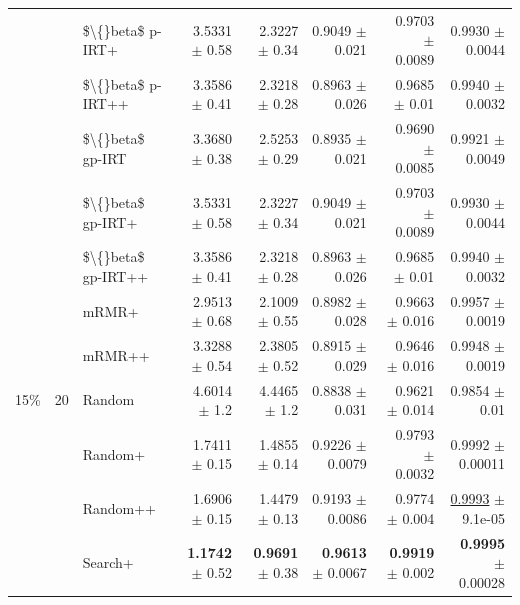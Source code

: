 \begin{longtable}{llp{}rrrrr}
 &  & \$\textbackslash\{\}beta\$ p-IRT+ & 3.5331 {\scriptsize $\pm$ 0.58} & 2.3227 {\scriptsize $\pm$ 0.34} & 0.9049 {\scriptsize $\pm$ 0.021} & 0.9703 {\scriptsize $\pm$ 0.0089} & 0.9930 {\scriptsize $\pm$ 0.0044} \\
 &  & \$\textbackslash\{\}beta\$ p-IRT++ & 3.3586 {\scriptsize $\pm$ 0.41} & 2.3218 {\scriptsize $\pm$ 0.28} & 0.8963 {\scriptsize $\pm$ 0.026} & 0.9685 {\scriptsize $\pm$ 0.01} & 0.9940 {\scriptsize $\pm$ 0.0032} \\
 &  & \$\textbackslash\{\}beta\$ gp-IRT & 3.3680 {\scriptsize $\pm$ 0.38} & 2.5253 {\scriptsize $\pm$ 0.29} & 0.8935 {\scriptsize $\pm$ 0.021} & 0.9690 {\scriptsize $\pm$ 0.0085} & 0.9921 {\scriptsize $\pm$ 0.0049} \\
 &  & \$\textbackslash\{\}beta\$ gp-IRT+ & 3.5331 {\scriptsize $\pm$ 0.58} & 2.3227 {\scriptsize $\pm$ 0.34} & 0.9049 {\scriptsize $\pm$ 0.021} & 0.9703 {\scriptsize $\pm$ 0.0089} & 0.9930 {\scriptsize $\pm$ 0.0044} \\
 &  & \$\textbackslash\{\}beta\$ gp-IRT++ & 3.3586 {\scriptsize $\pm$ 0.41} & 2.3218 {\scriptsize $\pm$ 0.28} & 0.8963 {\scriptsize $\pm$ 0.026} & 0.9685 {\scriptsize $\pm$ 0.01} & 0.9940 {\scriptsize $\pm$ 0.0032} \\
 &  & mRMR+ & 2.9513 {\scriptsize $\pm$ 0.68} & 2.1009 {\scriptsize $\pm$ 0.55} & 0.8982 {\scriptsize $\pm$ 0.028} & 0.9663 {\scriptsize $\pm$ 0.016} & 0.9957 {\scriptsize $\pm$ 0.0019} \\
 &  & mRMR++ & 3.3288 {\scriptsize $\pm$ 0.54} & 2.3805 {\scriptsize $\pm$ 0.52} & 0.8915 {\scriptsize $\pm$ 0.029} & 0.9646 {\scriptsize $\pm$ 0.016} & 0.9948 {\scriptsize $\pm$ 0.0019} \\
\midrule
15\% & 20 & Random & 4.6014 {\scriptsize $\pm$ 1.2} & 4.4465 {\scriptsize $\pm$ 1.2} & 0.8838 {\scriptsize $\pm$ 0.031} & 0.9621 {\scriptsize $\pm$ 0.014} & 0.9854 {\scriptsize $\pm$ 0.01} \\
 &  & Random+ & 1.7411 {\scriptsize $\pm$ 0.15} & 1.4855 {\scriptsize $\pm$ 0.14} & 0.9226 {\scriptsize $\pm$ 0.0079} & 0.9793 {\scriptsize $\pm$ 0.0032} & 0.9992 {\scriptsize $\pm$ 0.00011} \\
 &  & Random++ & 1.6906 {\scriptsize $\pm$ 0.15} & 1.4479 {\scriptsize $\pm$ 0.13} & 0.9193 {\scriptsize $\pm$ 0.0086} & 0.9774 {\scriptsize $\pm$ 0.004} & \underline{0.9993} {\scriptsize $\pm$ 9.1e-05} \\
 &  & Search+ & \textbf{1.1742} {\scriptsize $\pm$ 0.52} & \textbf{0.9691} {\scriptsize $\pm$ 0.38} & \textbf{0.9613} {\scriptsize $\pm$ 0.0067} & \textbf{0.9919} {\scriptsize $\pm$ 0.002} & \textbf{0.9995} {\scriptsize $\pm$ 0.00028} \\

\end{longtable}
